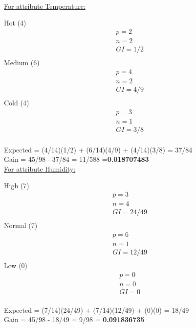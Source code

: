 \documentclass[8pt, fullpage,letterpaper]{article}
\begin{document}
\begin{enumerate}
\begin{enumerate}
\begin{enumerate}
\begin{enumerate}
\begin{itemize}
						\underline {For attribute Temperature:} 
							\vspace{-5pt}
							\begin{multicols}{3}
								Hot (4)
			 						\begin{align*}
									    	& p = 2\\
										& n = 2 \\
									    	& GI = 1/2\\
								      \end{align*}
								Medium (6)
			 						\begin{align*}
									    	& p = 4\\
										& n = 2 \\
									    	& GI = 4/9\\
								      \end{align*}
								Cold (4)
			 						\begin{align*}
									    	& p = 3\\
										& n = 1 \\
									    	& GI = 3/8\\
								      \end{align*}
							\end{multicols}
							\vspace{-20pt}
							Expected = (4/14)(1/2) + (6/14)(4/9) + (4/14)(3/8) = 37/84\\
							Gain = 45/98 - 37/84 = 11/588 ={\bf 0.018707483}\\

						\underline {For attribute Humidity:} 
							\vspace{-5pt}
							\begin{multicols}{3}
								High (7)
			 						\begin{align*}
									    	& p = 3\\
										& n = 4 \\
									    	& GI = 24/49\\
								      \end{align*}
								Normal (7)
			 						\begin{align*}
									    	& p = 6\\
										& n = 1 \\
									    	& GI = 12/49\\
								      \end{align*}
								Low (0)
			 						\begin{align*}
									    	& p = 0\\
										& n = 0 \\
									    	& GI = 0\\
								      \end{align*}
							\end{multicols}
							\vspace{-20pt}
							Expected = (7/14)(24/49) + (7/14)(12/49) + (0)(0) = 18/49\\
							Gain = 45/98 - 18/49 = 9/98 = {\bf 0.091836735}\\


\end{itemize}
\end{enumerate}
\end{enumerate}
\end{enumerate}
\end{enumerate}
\end{document}
